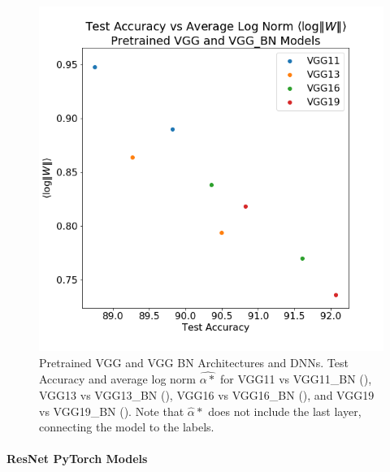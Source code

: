 \begin{figure}[!htb]
 \centering
   \includegraphics[scale=0.40]{img/vgg-lognorms.png}
   \caption{
Pretrained VGG and VGG BN Architectures and DNNs.  Test Accuracy and average log norm $\hat{\alpha*}$ for
 VGG11 vs VGG11\_BN ({\color{blue}{blue}}),
VGG13 vs VGG13\_BN ({\color{orange}{orange}}),
VGG16 vs VGG16\_BN ({\color{green}{green}}),  and
VGG19 vs VGG19\_BN ({\color{red}{red}}). 
Note that $\hat{\alpha}*$ does not include the last layer, connecting the model to the labels.
}
  \label{fig:vgg}
\end{figure}


\paragraph{ResNet PyTorch Models}

